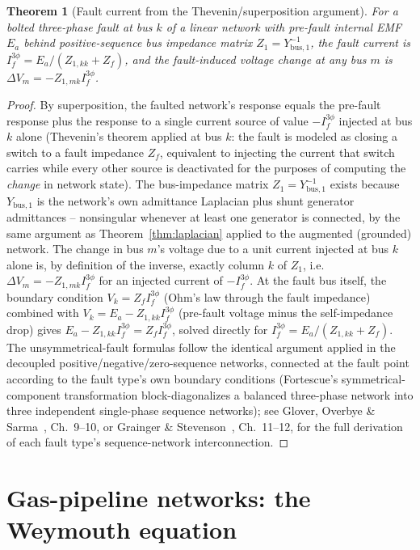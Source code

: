 \documentclass[11pt]{report}
\theoremstyle{plain}
\newtheorem{theorem}{Theorem}[chapter]
\theoremstyle{definition}
\theoremstyle{remark}
\begin{document}
\begin{theorem}[Fault current from the Thevenin/superposition argument]
\label{thm:zbus-fault}
For a bolted three-phase fault at bus $k$ of a linear network with
pre-fault internal EMF $E_a$ behind positive-sequence bus impedance
matrix $Z_1=Y_{\text{bus},1}^{-1}$, the fault current is
$I_f^{3\phi}=E_a/(Z_{1,kk}+Z_f)$, and the fault-induced voltage change
at any bus $m$ is $\Delta V_m=-Z_{1,mk}I_f^{3\phi}$.
\end{theorem}
\begin{proof}
By superposition, the faulted network's response equals the pre-fault
response plus the response to a single current source of value
$-I_f^{3\phi}$ injected at bus $k$ alone (Thevenin's theorem applied at
bus $k$: the fault is modeled as closing a switch to a fault impedance
$Z_f$, equivalent to injecting the current that switch carries while
every other source is deactivated for the purposes of computing the
\emph{change} in network state). The bus-impedance matrix $Z_1=
Y_{\text{bus},1}^{-1}$ exists because $Y_{\text{bus},1}$ is the
network's own admittance Laplacian plus shunt generator admittances --
nonsingular whenever at least one generator is connected, by the same
argument as Theorem~\ref{thm:laplacian} applied to the augmented
(grounded) network. The change in bus $m$'s voltage due to a unit
current injected at bus $k$ alone is, by definition of the inverse,
exactly column $k$ of $Z_1$, i.e.\ $\Delta V_m=-Z_{1,mk}I_f^{3\phi}$ for
an injected current of $-I_f^{3\phi}$. At the fault bus itself, the
boundary condition $V_k=Z_fI_f^{3\phi}$ (Ohm's law through the fault
impedance) combined with $V_k=E_a-Z_{1,kk}I_f^{3\phi}$ (pre-fault voltage
minus the self-impedance drop) gives $E_a-Z_{1,kk}I_f^{3\phi}=
Z_fI_f^{3\phi}$, solved directly for $I_f^{3\phi}=E_a/(Z_{1,kk}+Z_f)$.
The unsymmetrical-fault formulas follow the identical argument applied
in the decoupled positive/negative/zero-sequence networks, connected at
the fault point according to the fault type's own boundary conditions
(Fortescue's symmetrical-component transformation block-diagonalizes a
balanced three-phase network into three independent single-phase
sequence networks); see Glover, Overbye \&
Sarma~\cite{glover}, Ch.~9--10, or Grainger \&
Stevenson~\cite{graingerstevenson}, Ch.~11--12, for the full derivation
of each fault type's sequence-network interconnection.
\end{proof}

\section{Gas-pipeline networks: the Weymouth equation}
\end{document}
